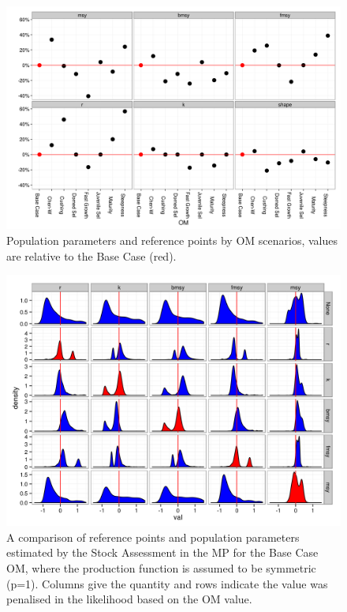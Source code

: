 \documentclass[%
nonumbib,      %
%
]{nrc1}                          %
\begin{document}
\begin{figure}[htbp]
\centering
\includegraphics[width=6in]{ssOMs.png}
\caption{Population parameters and reference points by OM scenarios, values are relative to the Base Case (red).}
\label{fig:popPar}
\end{figure}


\begin{figure}[htbp]
\centering
\includegraphics[width=6in]{SA1.png}
\caption{A comparison of reference points and population parameters estimated by the Stock Assessment in the MP for the Base Case OM, where the production function is assumed to be symmetric (p=1). Columns give the quantity and rows indicate the value was penalised in the likelihood based on the OM value.}
\label{fig:sa1}
\end{figure}
\end{document}
